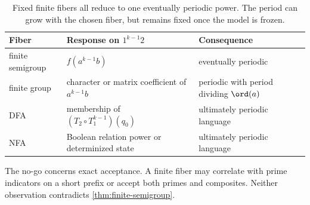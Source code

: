 \begin{table}[t]
\centering
\caption{Fixed finite fibers all reduce to one eventually periodic power.
The period can grow with the chosen fiber, but remains fixed once the model
is frozen.}
\label{tab:finitefibers}
\small
\begin{tabularx}{\textwidth}{L{3.0cm}YY}
\toprule
Fiber & Response on \(1^{k-1}2\) & Consequence \\
\midrule
finite semigroup
& \(f(a^{k-1}b)\)
& eventually periodic \\
finite group
& character or matrix coefficient of \(a^{k-1}b\)
& periodic with period dividing \(\ord(a)\) \\
DFA
& membership of \((T_2\circ T_1^{k-1})(q_0)\)
& ultimately periodic language \\
NFA
& Boolean relation power or determinized state
& ultimately periodic language \\
\bottomrule
\end{tabularx}
\end{table}

The no-go concerns exact acceptance.  A finite fiber may correlate with
prime indicators on a short prefix or accept both primes and composites.
Neither observation contradicts \cref{thm:finite-semigroup}.
